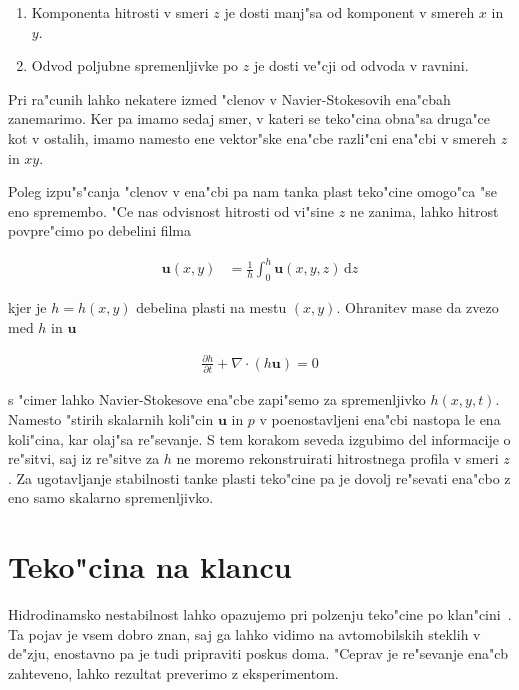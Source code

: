 \documentclass[a4paper,12pt]{article}
\renewcommand{\vec}{\mathbf}
\newcommand{\dd}{\,\mathrm{d}}
\begin{document}
\begin{enumerate}
  \item Komponenta hitrosti v smeri $z$ je dosti manj"sa od komponent v smereh $x$ in $y$. 
  \item Odvod poljubne spremenljivke po $z$ je dosti ve"cji od odvoda v ravnini. 
\end{enumerate}

Pri ra"cunih lahko nekatere izmed "clenov v Navier-Stokesovih ena"cbah zanemarimo. Ker pa imamo sedaj smer, v kateri se teko"cina obna"sa druga"ce kot v ostalih, imamo namesto ene vektor"ske ena"cbe razli"cni ena"cbi v smereh $z$ in $xy$. 

Poleg izpu"s"canja "clenov v ena"cbi pa nam tanka plast teko"cine omogo"ca "se eno spremembo. "Ce nas odvisnost hitrosti od vi"sine $z$ ne zanima, lahko hitrost povpre"cimo po debelini filma

\begin{align}
 \vec u(x,y) &=  \frac{1}{h}\int_0^h \vec u(x,y,z)\dd z
\end{align}

kjer je $h = h(x,y)$ debelina plasti na mestu $(x,y)$. Ohranitev mase da zvezo med $h$ in $\vec u$

\begin{align}
  \frac{\partial h}{\partial t} + \nabla\cdot(h\vec u) = 0
\end{align}

s "cimer lahko Navier-Stokesove ena"cbe zapi"semo za spremenljivko $h(x,y,t)$. Namesto "stirih skalarnih koli"cin $\vec u$ in $p$ v poenostavljeni ena"cbi nastopa le ena koli"cina, kar olaj"sa re"sevanje. S tem korakom seveda izgubimo del informacije o re"sitvi, saj iz re"sitve za $h$ ne moremo rekonstruirati hitrostnega profila v smeri $z$. Za ugotavljanje stabilnosti tanke plasti teko"cine pa je dovolj re"sevati ena"cbo z eno samo skalarno spremenljivko. 

\section{Teko"cina na klancu}

Hidrodinamsko nestabilnost lahko opazujemo pri polzenju teko"cine po klan"cini~\cite{kondic}. Ta pojav je vsem dobro znan, saj ga lahko vidimo na avtomobilskih steklih v de"zju, enostavno pa je tudi pripraviti poskus doma. "Ceprav je re"sevanje ena"cb zahteveno, lahko rezultat preverimo z eksperimentom. 
\end{document}
